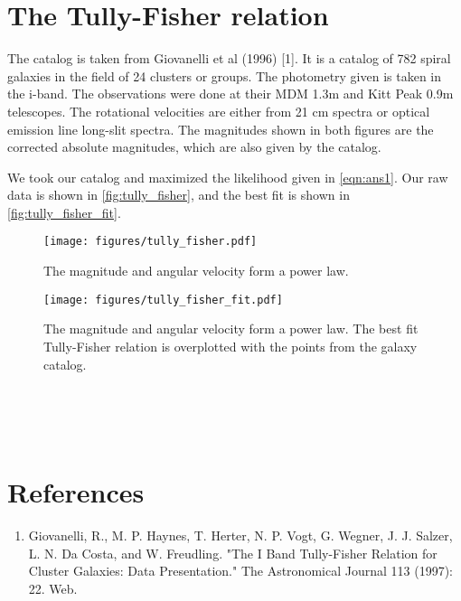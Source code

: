 \documentclass[12pt,a4paper]{article}
\begin{document}
\section{The Tully-Fisher relation}
The catalog is taken from Giovanelli et al (1996) [1]. It is a catalog of 782 spiral galaxies in the field of 24 clusters or groups. The photometry given is taken in the i-band. The observations were done at their MDM 1.3m and Kitt Peak 0.9m telescopes. The rotational velocities are either from 21 cm spectra or optical emission line long-slit spectra. The magnitudes shown in both figures are the corrected absolute magnitudes, which are also given by the catalog. 

We took our catalog and maximized the likelihood given in \autoref{eqn:ans1}.
Our raw data is shown in \autoref{fig:tully_fisher}, and the best
fit is shown in \autoref{fig:tully_fisher_fit}.


 \begin{figure}[ht]
  \centering
  \texttt{[image: figures/tully\_fisher.pdf]}
  \caption{The magnitude and angular velocity form a power law.}
  \label{fig:tully_fisher}
 \end{figure}

 \begin{figure}[ht]
  \centering
  \texttt{[image: figures/tully\_fisher\_fit.pdf]}
  \caption{The magnitude and angular velocity form a power law.
  The best fit Tully-Fisher relation is overplotted with the
  points from the galaxy catalog.}
  \label{fig:tully_fisher_fit}
 \end{figure}

\\\\\\

\section*{References}

\begin{enumerate}
  \item Giovanelli, R., M. P. Haynes, T. Herter, N. P. Vogt, G. Wegner, J. J. Salzer, L. N. Da Costa, and W. Freudling. "The I Band Tully-Fisher Relation for Cluster Galaxies: Data Presentation." The Astronomical Journal 113 (1997): 22. Web.
\end{enumerate}
\end{document}
